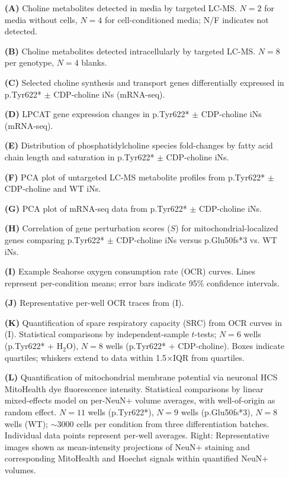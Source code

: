 \begin{itemize}
    \item[\textbf{(A)}] Choline metabolites detected in media by targeted LC-MS. $N=2$ for media without cells, $N=4$ for cell-conditioned media; N/F indicates not detected.
    \item[\textbf{(B)}] Choline metabolites detected intracellularly by targeted LC-MS. $N=8$ per genotype, $N=4$ blanks.
    \item[\textbf{(C)}] Selected choline synthesis and transport genes differentially expressed in p.Tyr622* $\pm$ CDP-choline iNs (mRNA-seq).
    \item[\textbf{(D)}] LPCAT gene expression changes in p.Tyr622* $\pm$ CDP-choline iNs (mRNA-seq).
    \item[\textbf{(E)}] Distribution of phosphatidylcholine species fold-changes by fatty acid chain length and saturation in p.Tyr622* $\pm$ CDP-choline iNs.
    \item[\textbf{(F)}] PCA plot of untargeted LC-MS metabolite profiles from p.Tyr622* $\pm$ CDP-choline and WT iNs.
    \item[\textbf{(G)}] PCA plot of mRNA-seq data from p.Tyr622* $\pm$ CDP-choline iNs.
    \item[\textbf{(H)}] Correlation of gene perturbation scores ($S$) for mitochondrial-localized genes comparing p.Tyr622* $\pm$ CDP-choline iNs versus p.Glu50fs*3 vs. WT iNs.
    \item[\textbf{(I)}] Example Seahorse oxygen consumption rate (OCR) curves. Lines represent per-condition means; error bars indicate 95\% confidence intervals.
    \item[\textbf{(J)}] Representative per-well OCR traces from (I).
    \item[\textbf{(K)}] Quantification of spare respiratory capacity (SRC) from OCR curves in (I). Statistical comparisons by independent-sample $t$-tests; $N=6$ wells (p.Tyr622* + H$_2$O), $N=8$ wells (p.Tyr622* + CDP-choline). Boxes indicate quartiles; whiskers extend to data within 1.5$\times$IQR from quartiles.
    \item[\textbf{(L)}] Quantification of mitochondrial membrane potential via neuronal HCS MitoHealth dye fluorescence intensity. Statistical comparisons by linear mixed-effects model on per-NeuN+ volume averages, with well-of-origin as random effect. $N=11$ wells (p.Tyr622*), $N=9$ wells (p.Glu50fs*3), $N=8$ wells (WT); $\sim3000$ cells per condition from three differentiation batches. Individual data points represent per-well averages. Right: Representative images shown as mean-intensity projections of NeuN+ staining and corresponding MitoHealth and Hoechst signals within quantified NeuN+ volumes.
\end{itemize}